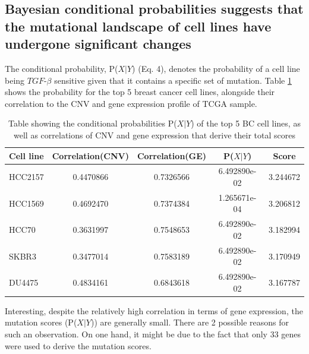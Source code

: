 \documentclass[a4paper,12pt]{article}
\begin{document}
\subsection{Bayesian conditional probabilities suggests that
  the mutational landscape of cell lines have undergone significant
  changes}
The conditional probability, P($\textit{X}$$\mid$$\textit{Y}$)
(Eq. 4), denotes the probability of a cell line being
$\textit{TGF}$-$\beta$ sensitive given that it contains a specific
set of mutation. Table \ref{pxy} shows the probability for the top 5
breast cancer cell lines, alongside their correlation to the CNV and
gene expression profile of TCGA sample.
\begin{table}
\caption[Table showing scores of the top 5 breast cell lines and
associated scores ]{Table
  showing the conditional probabilities
  P($\textit{X}$$\mid$$\textit{Y}$) of the top 5 BC cell lines, as well as
  correlations of CNV and gene expression that derive their total scores}
\label{pxy}
\begin{tabular}{l  c  c  c c}
\hline
Cell line & Correlation(CNV) & Correlation(GE) &
P($\textit{X}$$\mid$$\textit{Y}$) & Score \\
\hline
HCC2157 & 0.4470866 & 0.7326566 & 6.492890e-02 & 3.244672\\
HCC1569 & 0.4692470 & 0.7374384 & 1.265671e-04 & 3.206812\\
HCC70   & 0.3631997 & 0.7548653 & 6.492890e-02 & 3.182994\\
SKBR3   & 0.3477014 & 0.7583189 & 6.492890e-02 & 3.170949\\
DU4475  & 0.4834161 & 0.6843618 & 6.492890e-02 & 3.167787\\
\hline
\end{tabular}
\end{table}
Interesting, despite the relatively high correlation in terms of gene
expression, the mutation scores (P($\textit{X}$$\mid$$\textit{Y}$)) are
generally small. There are 2 possible reasons for such an
observation. On one hand, it might be due to the fact that only 33
genes were used to derive the mutation scores.
\end{document}

